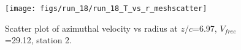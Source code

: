 \begin{figure}[H]
\centering
\texttt{[image: figs/run\_18/run\_18\_T\_vs\_r\_meshscatter]}
\caption{Scatter plot of azimuthal velocity vs radius at $z/c$=6.97, $V_{free}$=29.12, station 2.}
\label{fig:run_18_T_vs_r_meshscatter}
\end{figure}


